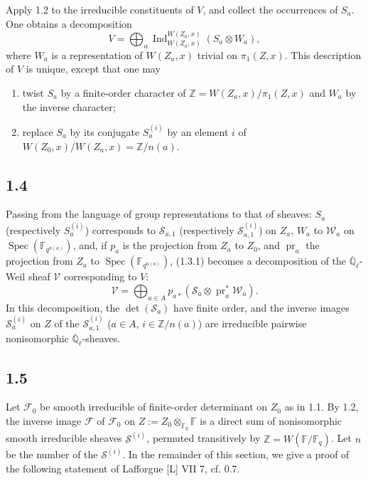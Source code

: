 \documentclass[10pt]{article}
\newcommand{\F}{\mathbb{F}}
\newcommand{\Z}{\mathbb{Z}}
\newcommand{\Ql}{\overline{\mathbb Q}_{\ell}}
\newcommand{\Spec}{\operatorname{Spec}}
\newcommand{\Ind}{\operatorname{Ind}}
\newcommand{\pr}{\operatorname{pr}}
\begin{document}
Apply 1.2 to the irreducible constituents of $V$, and collect the occurrences of $S_a$.
One obtains a decomposition
\begin{equation}
 V=\bigoplus_a \Ind_{W(Z_a,x)}^{W(Z_0,x)}(S_a\otimes W_a),
\tag{1.3.1}
\end{equation}
where $W_a$ is a representation of $W(Z_a,x)$ trivial on $\pi_1(Z,x)$.
This description of $V$ is unique, except that one may
\begin{enumerate}[label=\alph*)]
\item twist $S_a$ by a finite-order character of $\Z=W(Z_a,x)/\pi_1(Z,x)$ and $W_a$ by the inverse character;
\item replace $S_a$ by its conjugate $S_a^{(i)}$ by an element $i$ of $W(Z_0,x)/W(Z_a,x)=\Z/n(a)$.
\end{enumerate}

\subsection*{1.4}
Passing from the language of group representations to that of sheaves: $S_a$ (respectively $S_a^{(i)}$) corresponds to $\mathcal S_{a,1}$ (respectively $\mathcal S_{a,1}^{(i)}$) on $Z_a$, $W_a$ to $\mathcal W_a$ on $\Spec(\F_{q^{n(a)}})$, and, if $p_a$ is the projection from $Z_a$ to $Z_0$, and $\pr_a$ the projection from $Z_a$ to $\Spec(\F_{q^{n(a)}})$, (1.3.1) becomes a decomposition of the $\Ql$-Weil sheaf $\mathcal V$ corresponding to $V$:
\begin{equation}
 \mathcal V=\bigoplus_{a\in A}p_{a*}\left(\mathcal S_a\otimes\pr_a^*\mathcal W_a\right).
\tag{1.4.1}
\end{equation}
In this decomposition, the $\det(\mathcal S_a)$ have finite order, and the inverse images $\mathcal S_a^{(i)}$ on $Z$ of the $\mathcal S_{a,1}^{(i)}$ ($a\in A$, $i\in\Z/n(a)$) are irreducible pairwise nonisomorphic $\Ql$-sheaves.

\subsection*{1.5}
Let $\mathcal F_0$ be smooth irreducible of finite-order determinant on $Z_0$ as in 1.1.
By 1.2, the inverse image $\mathcal F$ of $\mathcal F_0$ on $Z:=Z_0\otimes_{\F_q}\F$ is a direct sum of nonisomorphic smooth irreducible sheaves $\mathcal S^{(i)}$, permuted transitively by $\Z=W(\F/\F_q)$.
Let $n$ be the number of the $\mathcal S^{(i)}$.
In the remainder of this section, we give a proof of the following statement of Lafforgue [L] VII 7, cf. 0.7.
\end{document}
